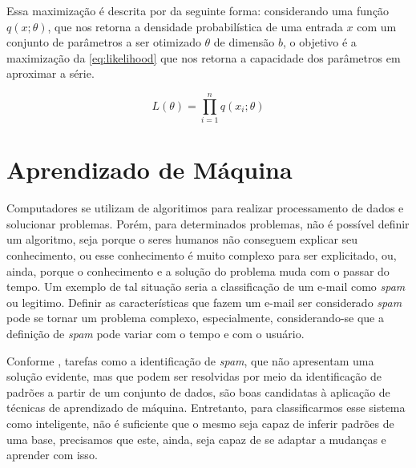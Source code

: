 \documentclass[
    12pt,
    oneside,
    a4paper,
    english,
    brazil
]{abntex2}
\begin{document}
Essa  maximização   é  descrita   por     da  seguinte
forma:  considerando  uma função  $q(x;\theta)$, que  nos retorna  a  densidade
probabilística de uma entrada $x$ com um conjunto de parâmetros a ser otimizado
$\theta$ de dimensão $b$, o objetivo é a maximização da \autoref{eq:likelihood}
que nos retorna a capacidade dos parâmetros em aproximar a série.

\begin{equation}\label{eq:likelihood}
    L(\theta) = \prod_{i=1}^{n}{q(x_i;\theta)}
\end{equation}


\section{Aprendizado de Máquina}

Computadores se utilizam de algoritimos  para realizar processamento de dados e
solucionar  problemas.  Porém,  para  determinados problemas,  não  é  possível
definir um  algoritmo, seja porque o  seres humanos não conseguem  explicar seu
conhecimento, ou esse conhecimento é  muito complexo para ser  explicitado, ou,
ainda, porque  o conhecimento  e a  solução do  problema muda  com o  passar do
tempo.  Um exemplo  de tal  situação seria  a classificação  de um  e-mail como
\textit{spam} ou legitimo.  Definir as características que fazem  um e-mail ser
considerado \textit{spam}  pode se  tornar um problema complexo, especialmente,
considerando-se que  a definição  de \textit{spam}  pode variar  com o  tempo e
com o usuário.

Conforme , tarefas como a identificação de \textit{spam}, que
não apresentam  uma solução  evidente, mas  que podem  ser resolvidas  por meio
da  identificação  de padrões  a  partir  de um  conjunto  de  dados, são  boas
candidatas à aplicação de técnicas  de aprendizado de máquina. Entretanto, para
classificarmos esse sistema como inteligente, não é suficiente que o mesmo seja
capaz de inferir padrões de uma base, precisamos que este, ainda, seja capaz de
se adaptar a mudanças e aprender com isso.
\end{document}
